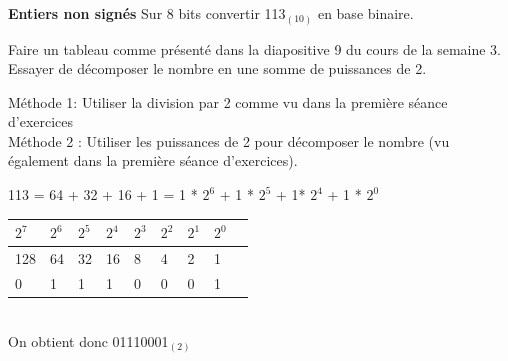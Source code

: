 \begin{Exercice}[5 minutes] \textbf{Entiers non signés}
	Sur 8 bits convertir 113$_{(10)}$ en base binaire.
   
    \begin{conseil}
		Faire un tableau comme présenté dans la diapositive 9 du cours de la semaine 3. Essayer de décomposer le nombre en une somme de puissances de 2.
    \end{conseil}
    
    \begin{solution}
        Méthode 1: Utiliser la division par 2 comme vu dans la première séance d'exercices\\
        
        Méthode 2 : Utiliser les puissances de 2 pour décomposer le nombre (vu également dans la première séance d'exercices).
        
        113 = 64 + 32 + 16 + 1 = 1 * $2^6$ + 1 * $2^5$ + 1* $2^4$ + 1 * $2^0$ \\
        
        \begin{tabular}{| p{1cm} | p{1cm} | p{1cm} | p{1cm} | p{1cm} | p{1cm} | p{1cm} | p{1cm} | p{1cm} |} 
            \hline
	      	$2^7$ & $2^6$ & $2^5$ & $2^4$ & $2^3$ & $2^2$ & $2^1$ & $2^0$ \\ [0.5ex]
	    	\hline
            128 & 64 & 32 & 16 & 8 & 4 & 2 & 1 \\ [0.5ex] 
            \hline
            0 & 1 & 1 & 1 & 0 & 0 & 0 & 1 \\ [0.5ex] 
            \hline
        \end{tabular} \\
        
        On obtient donc 01110001$_{(2)}$ \\
    \end{solution}
\end{Exercice}

